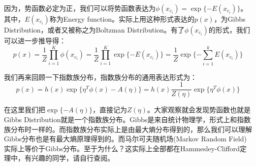 \documentclass[a4paper]{article}
\begin{document}
因为，势函数必定为正，我们可以将势函数表达为$\phi(x_{c_i}) = \exp\{ -E(x_{c_i}) \}$。其中，$E(x_{c_i})$称为Energy function。实际上用这种形式表达的$p(x)$，为Gibbs Distribution，或者又被称之为Boltzman Distribution。有了$\phi(x_{c_i})$的形式，我们可以进一步推导得：
\begin{equation}
    p(x) = \frac{1}{Z}\prod_{i=1}^K\phi(x_{c_i}) = \frac{1}{Z}\prod_{i=1}^K \exp\{ -E(x_{c_i}) \} = \frac{1}{Z}\exp\{ - \sum_{i=1}^k E(x_{c_i}) \}
\end{equation}

我们再来回顾一下指数族分布，指数族分布的通用表达形式为：
\begin{equation}
    p(x) = h(x)\exp\{ \eta^T\phi(x) - A(\eta) \} = h(x)\frac{1}{Z(\eta)}\exp\{ \eta^T\phi(x)\}
\end{equation}

在这里我们把$\exp\{ - A(\eta) \}$，直接记为$Z(\eta)$。大家观察就会发现势函数也就是Gibbs Distribution就是一个指数族分布。Gibbs是来自统计物理学，形式上和指数族分布时一样的。而指数族分布实际上是由最大熵分布得到的，那么我们可以理解Gibbs分布也是有最大熵原理得到的。而马尔可夫随机场(Markov Random Field)实际上等价于Gibbs分布。至于为什么？这实际上全部都在Hammesley-Clifford定理中，有兴趣的同学，请自行查阅。
\end{document}
